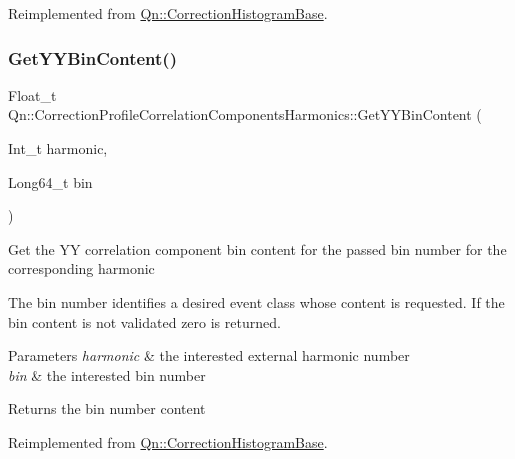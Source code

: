 Reimplemented from \mbox{\hyperlink{classQn_1_1CorrectionHistogramBase_a2dc192026e8bb323cb7a93c5d36584bf}{Qn\+::\+Correction\+Histogram\+Base}}.

\mbox{\label{classQn_1_1CorrectionProfileCorrelationComponentsHarmonics_a0256be6f18beb3a2562891e2912b55fb}} 
\subsubsection{\texorpdfstring{Get\+Y\+Y\+Bin\+Content()}{GetYYBinContent()}}
{\footnotesize\ttfamily Float\+\_\+t Qn\+::\+Correction\+Profile\+Correlation\+Components\+Harmonics\+::\+Get\+Y\+Y\+Bin\+Content (\begin{DoxyParamCaption}\item[{Int\+\_\+t}]{harmonic,  }\item[{Long64\+\_\+t}]{bin }\end{DoxyParamCaption})\hspace{0.3cm}{\ttfamily [virtual]}}

Get the YY correlation component bin content for the passed bin number for the corresponding harmonic

The bin number identifies a desired event class whose content is requested. If the bin content is not validated zero is returned.


\begin{DoxyParams}{Parameters}
{\em harmonic} & the interested external harmonic number \\
\hline
{\em bin} & the interested bin number \\
\hline
\end{DoxyParams}
\begin{DoxyReturn}{Returns}
the bin number content 
\end{DoxyReturn}


Reimplemented from \mbox{\hyperlink{classQn_1_1CorrectionHistogramBase_a65c27d6aca78e2ada1be160c48958c3e}{Qn\+::\+Correction\+Histogram\+Base}}.

\mbox{\label{classQn_1_1CorrectionProfileCorrelationComponentsHarmonics_a66b580c99a004f475f612b0835ff9da1}} 
